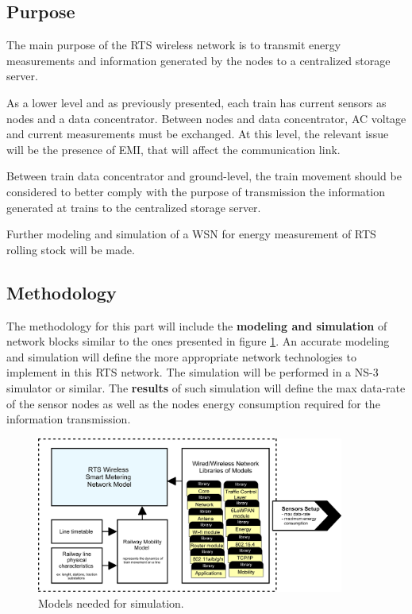 \subsection{Purpose}

The main purpose of the \ac{RTS} wireless network is to transmit energy measurements and information generated by the nodes to a centralized storage server. 

As a lower level and as previously presented, each train has current sensors as nodes and a data concentrator. Between nodes and data concentrator, \ac{AC} voltage and current measurements must be exchanged.
At this level, the relevant issue will be the presence of \ac{EMI}, that will affect the communication link.

Between train data concentrator and ground-level, the train movement should be considered to better comply with the purpose of transmission the information generated at trains to the centralized storage server. 

Further modeling and simulation of a \ac{WSN} for energy measurement of \ac{RTS} rolling stock will be made.



\subsection{Methodology}

The methodology for this part will include the \textbf{modeling and simulation} of network blocks similar to the ones presented in figure \ref{fig:4.methodWireless}. An accurate modeling and simulation will define the more appropriate network technologies to implement in this \ac{RTS} network. 
The simulation will be performed in a NS-3 simulator or similar.
The \textbf{results} of such simulation will define the max data-rate of the sensor nodes as well as the nodes energy consumption required for the information transmission.

\begin{figure}[h!]
	\centering
	\includegraphics[width=0.9\textwidth,keepaspectratio]{figures/4.Method/methodWireless}
	\caption{Models needed for simulation.}
	\label{fig:4.methodWireless}
\end{figure}

